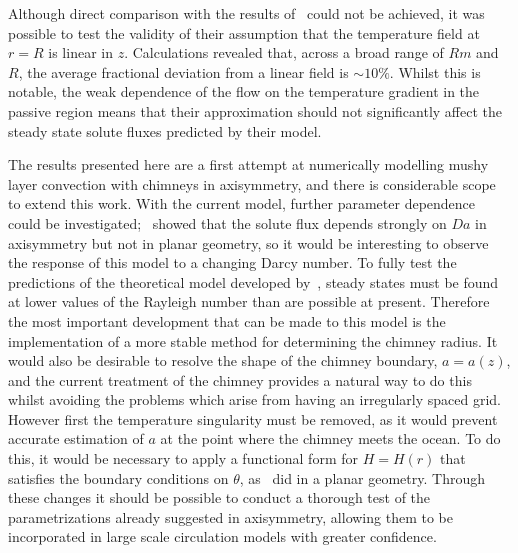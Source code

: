 \documentclass[11pt,twocolumn]{article}
\begin{document}
Although direct comparison with the results of~\citet*{rees-jones-worster-13} could not be achieved, it was possible to test the validity of their assumption that the temperature field at $r=R$ is linear in $z$. Calculations revealed that, across a broad range of $Rm$ and $R$, the average fractional deviation from a linear field is $\sim10\%$. Whilst this is notable, the weak dependence of the flow on the temperature gradient in the passive region means that their approximation should not significantly  affect the steady state solute fluxes predicted by their model.

The results presented here are a first attempt at numerically modelling mushy layer convection with chimneys in axisymmetry, and there is considerable scope to extend this work. With the current model, further parameter dependence could be investigated;~\citet*{rees-jones-worster-13} showed that the solute flux depends strongly on $Da$ in axisymmetry but not in planar geometry, so it would be interesting to observe the response of this model to a changing Darcy number. To fully test the predictions of the theoretical model developed by~\citet*{rees-jones-worster-13}, steady states must be found at lower values of the Rayleigh number than are possible at present. Therefore the most important development that can be made to this model is the implementation of a more stable method for determining the chimney radius. It would also be desirable to resolve the shape of the chimney boundary, $a=a(z)$, and the current treatment of the chimney provides a natural way to do this whilst avoiding the problems which arise from having an irregularly spaced grid. However first the temperature singularity must be removed, as it would prevent accurate estimation of $a$ at the point where the chimney meets the ocean. To do this, it would be necessary to apply a functional form for $H = H(r)$ that satisfies the boundary conditions on $\theta$, as~\citet*{schulze-worster-98} did in a planar geometry. Through these changes it should be possible to conduct a thorough test of the parametrizations already suggested in axisymmetry, allowing them to be incorporated in large scale circulation models with greater confidence.

\onecolumn
{}








\end{document}

